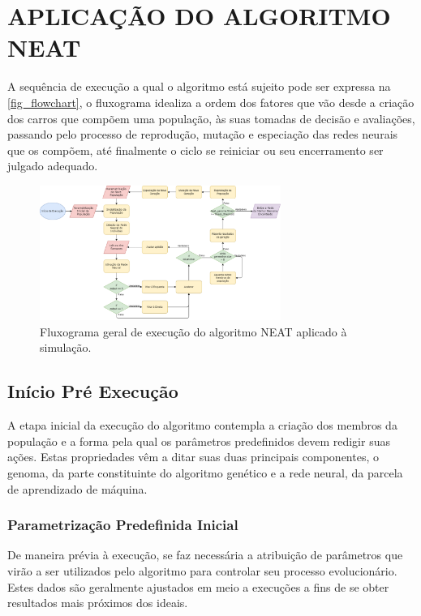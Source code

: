 \section{APLICA{\c C}{\~A}O DO ALGORITMO NEAT}
A sequência de execução a qual o algoritmo está sujeito pode ser expressa na \autoref{fig_flowchart}, o fluxograma idealiza a ordem dos fatores que vão desde a criação dos carros que compõem uma população, às suas tomadas de decisão e avaliações, passando pelo processo de reprodução, mutação e especiação das redes neurais que os compõem, até finalmente o ciclo se reiniciar ou seu encerramento ser julgado adequado.

\begin{figure}[htb]
        \centering
        \caption{\label{fig_flowchart}Fluxograma geral de execução do algoritmo NEAT aplicado à simulação.}
        \includegraphics[width=0.7\textwidth]{images/flowchart.png}
\end{figure}

\subsection{Início Pré Execução}
A etapa inicial da execução do algoritmo contempla a criação dos membros da população e a forma pela qual os parâmetros predefinidos devem redigir suas ações. Estas propriedades vêm a ditar suas duas principais componentes, o genoma, da parte constituinte do algoritmo genético e a rede neural, da parcela de aprendizado de máquina.

\subsubsection{Parametrização Predefinida Inicial}
De maneira prévia à execução, se faz necessária a atribuição de parâmetros que virão a ser utilizados pelo algoritmo para controlar seu processo evolucionário. Estes dados são geralmente ajustados em meio a execuções a fins de se obter resultados mais próximos dos ideais.

